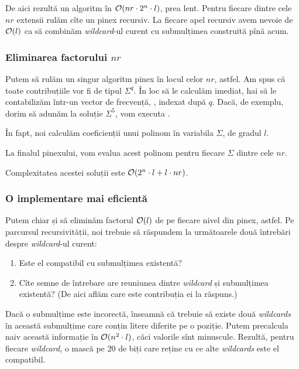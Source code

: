 \documentclass[../main.tex]{subfiles}
\begin{document}
De aici rezultă un algoritm în $\mathcal{O}(nr \cdot 2^n \cdot l)$, prea lent. Pentru fiecare dintre cele $nr$ extensii rulăm cîte un pinex recursiv. La fiecare apel recursiv avem nevoie de $\mathcal{O}(l)$ ca să combinăm \textit{wildcard}-ul curent cu submulțimea construită pînă acum.

\subsubsection*{Eliminarea factorului $nr$}

Putem să rulăm un singur algoritm pinex în locul celor $nr$, astfel. Am spus că toate contribuțiile vor fi de tipul $\Sigma^q$. În loc să le calculăm imediat, hai să le contabilizăm într-un vector de frecvență, , indexat după $q$. Dacă, de exemplu, dorim să adunăm la soluție $\Sigma^5$, vom executa .

În fapt, noi calculăm coeficienții unui polinom în variabila $\Sigma$, de gradul $l$.

La finalul pinexului, vom evalua acest polinom pentru fiecare $\Sigma$ dintre cele $nr$.

Complexitatea acestei soluții este $\mathcal{O}(2^n \cdot l + l \cdot nr)$.

\subsubsection*{O implementare mai eficientă}

Putem chiar și să eliminăm factorul $\mathcal{O}(l)$ de pe fiecare nivel din pinex, astfel. Pe parcursul recursivității, noi trebuie să răspundem la următoarele două întrebări despre \textit{wildcard}-ul curent:

\begin{enumerate}
  \item Este el compatibil cu submulțimea existentă?

  \item Cîte semne de întrebare are reuniunea dintre \textit{wildcard} și submulțimea existentă? (De aici aflăm care este contribuția ei la răspuns.)
\end{enumerate}

Dacă o submulțime este incorectă, înseamnă că trebuie să existe două \textit{wildcards} în această submulțime care conțin litere diferite pe o poziție. Putem precalcula naiv această informație în $\mathcal{O}(n^2 \cdot l)$, căci valorile sînt minuscule. Rezultă, pentru fiecare \textit{wildcard}, o mască pe 20 de biți care reține cu ce alte \textit{wildcards} este el compatibil.
\end{document}
